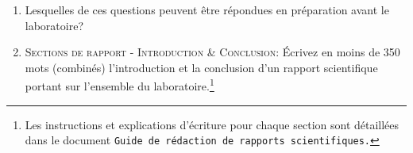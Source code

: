 \documentclass[canadien,12pt,oneside,letterpaper]{article}
\begin{document}
\begin{enumerate}
\item Lesquelles de ces questions peuvent être répondues en préparation avant le laboratoire?
\item \textsc{Sections de rapport - Introduction \& Conclusion:} Écrivez en moins de 350 mots (combinés) l'introduction et la conclusion d'un rapport scientifique portant sur l'ensemble du laboratoire.\footnote{Les instructions et explications d'écriture pour chaque section sont détaillées dans le document \texttt{Guide de rédaction de rapports scientifiques.}}
\end{enumerate}
\end{document}
